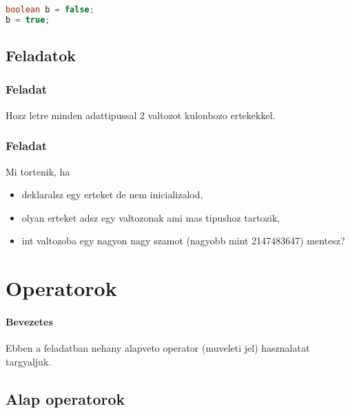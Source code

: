 \documentclass{article}
\begin{document}
\begin{lstlisting}[language=Java, caption=Egy false kezdoerteku boolean valtozot modositunk.]
boolean b = false;
b = true;
\end{lstlisting}

\newpage

\subsection{Feladatok}

\subsubsection{Feladat}

Hozz letre minden adattipussal 2 valtozot kulonbozo ertekekkel.

\subsubsection{Feladat}

Mi tortenik, ha
\begin{itemize}
    \item deklaralsz egy erteket de nem inicializalod,
    \item olyan erteket adsz egy valtozonak ami mas tipushoz tartozik,
    \item int valtozoba egy nagyon nagy szamot (nagyobb mint 2147483647) mentesz?
\end{itemize}

\newpage
\section{Operatorok}

\paragraph{Bevezetes}

Ebben a feladatban nehany alapveto operator (muveleti jel) hasznalatat targyaljuk.

\subsection{Alap operatorok}
\end{document}
